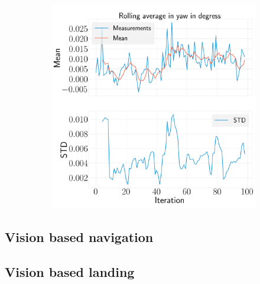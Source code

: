 \documentclass[../Head/report.tex]{subfiles}
\begin{document}
\begin{figure}[H]
\begin{subfigure}[t]{.30\textwidth}
        \caption{}
        \label{fig:GPS2Vision_pose_estimation_test2_roll}
    \end{subfigure}
     \hspace{0.2em}
    \begin{subfigure}[t]{.30\textwidth}
        \centering
        \includegraphics[width=\textwidth]{../Figures/analyse_rolling_average/test2/Calculated_rolling_average_in_yaw_with_mean_and_STD.png}
        \caption{}
        \label{fig:GPS2Vision_pose_estimation_test2_roll}
    \end{subfigure}
    \caption{}
    \label{fig:GPS2Vision_pose_estimation_test2_error_ori}
\end{figure}

\subsection{Vision based navigation}


\subsection{Vision based landing}
\end{document}
